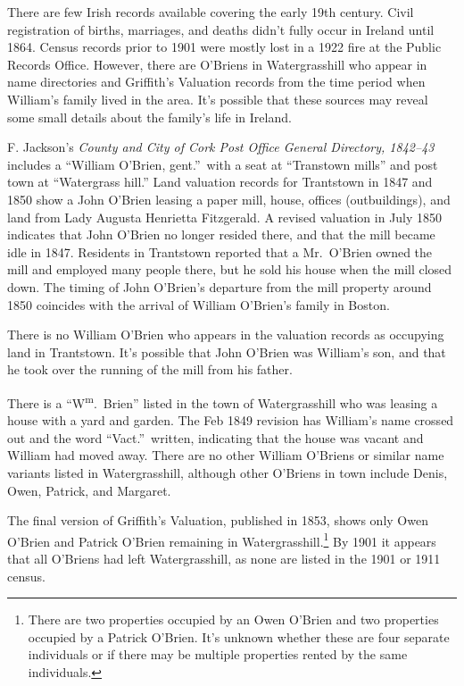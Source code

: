 There are few Irish records available covering the early 19th century. Civil registration of births, marriages, and deaths didn't fully occur in Ireland until 1864.\citep{Grenham1} Census records prior to 1901 were mostly lost in a 1922 fire at the Public Records Office.\citep{Grenham18} However, there are O'Briens in Watergrasshill who appear in name directories and Griffith's Valuation records from the time period when William's family lived in the area. It's possible that these sources may reveal some small details about the family's life in Ireland.

F. Jackson's \textit{County and City of Cork Post Office General Directory, 1842--43} includes a ``William O'Brien, gent.''\ with a seat at ``Transtown mills'' and post town at ``Watergrass hill.''\citep{Jacksons} Land valuation records for Trantstown in 1847 and 1850 show a John O'Brien leasing a paper mill, house, offices (outbuildings), and land from Lady Augusta Henrietta Fitzgerald.\citep{Peramb1847,Peramb1850} A revised valuation in July 1850 indicates that John O'Brien no longer resided there, and that the mill became idle in 1847.\citep{House1850} Residents in Trantstown reported that a Mr.\ O'Brien owned the mill and employed many people there, but he sold his house when the mill closed down.\citep{PaperMill} The timing of John O'Brien's departure from the mill property around 1850 coincides with the arrival of William O'Brien's family in Boston.

There is no William O'Brien who appears in the valuation records as occupying land in Trantstown. It's possible that John O'Brien was William's son, and that he took over the running of the mill from his father. 

There is a ``W\textsuperscript{m}.\ Brien'' listed in the town of Watergrasshill who was leasing a house with a yard and garden.\cite{House1849:4} The Feb 1849 revision has William's name crossed out and the word ``Vact.''\ written, indicating that the house was vacant and William had moved away.\citep{House1849-2} There are no other William O'Briens or similar name variants listed in Watergrasshill, although other O'Briens in town include Denis,\cite{House1849:6dennis} Owen,\cite{House1849:6owen} Patrick,\cite{House1849:7} and Margaret.\cite{House1849:11}

The final version of Griffith's Valuation, published in 1853, shows only Owen O'Brien\cite{Griffiths:46,Griffiths:90} and Patrick O'Brien\cite{Griffiths:90} remaining in Watergrasshill.\footnote{There are two properties occupied by an Owen O'Brien and two properties occupied by a Patrick O'Brien. It's unknown whether these are four separate individuals or if there may be multiple properties rented by the same individuals.} By 1901 it appears that all O'Briens had left Watergrasshill, as none are listed in the 1901 or 1911 census.\cite{1901IrishCensus,1911IrishCensus}

